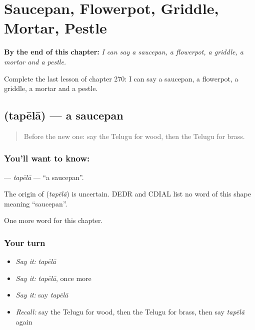 
\chapter{Saucepan, Flowerpot, Griddle, Mortar, Pestle}
\label{ch:te-saucepan-flowerpot-griddle-mortar-pestle}

\begin{chapteropening}
\textbf{By the end of this chapter:} \emph{I can say a saucepan, a flowerpot, a griddle, a mortar and a pestle.}

Complete the last lesson of chapter 270: I can say a saucepan, a flowerpot, a griddle, a mortar and a pestle.
\end{chapteropening}

\section[\texorpdfstring{\te{తపేలా} (tapēlā)}{తపేలా (tapēlā)}]{ (tapēlā) — a saucepan}

\label{lesson:TE-C270-tapela}



\begin{quote}
Before the new one: say the Telugu for wood, then the Telugu for brass.
\end{quote}

\subsection*{You'll want to know: }
\textbf{} — \emph{tapēlā} — \textquotedblleft{}a saucepan\textquotedblright{}.

\begin{cousinweb}
The origin of \textbf{} (\emph{tapēlā}) is uncertain. DEDR and CDIAL list no word of this shape meaning \textquotedblleft{}saucepan\textquotedblright{}.
\end{cousinweb}

\begin{grammarlens}[title={What you've built}]
One more word for this chapter.
\end{grammarlens}

\subsection*{Your turn}
\begin{itemize}
\raggedright
  \item \emph{Say it:} \emph{tapēlā}
  \item \emph{Say it:} \emph{tapēlā}, once more
  \item \emph{Say it:} say \emph{tapēlā}
  \item \emph{Recall:} say the Telugu for wood, then the Telugu for brass, then say \emph{tapēlā} again
\end{itemize}

